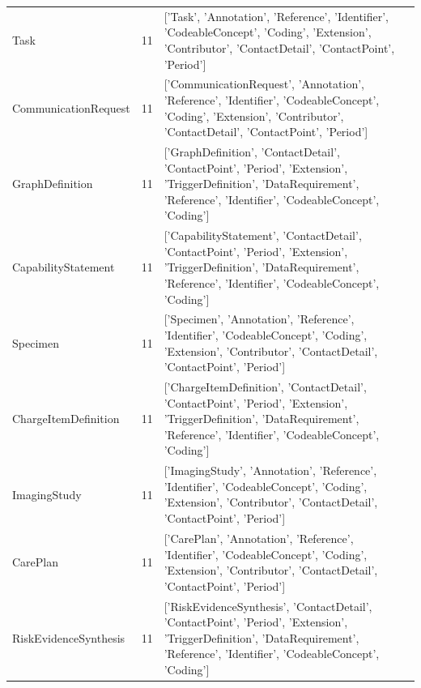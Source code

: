 \begin{tabular}{lrl}
Task & 11 & ['Task', 'Annotation', 'Reference', 'Identifier', 'CodeableConcept', 'Coding', 'Extension', 'Contributor', 'ContactDetail', 'ContactPoint', 'Period'] \\
CommunicationRequest & 11 & ['CommunicationRequest', 'Annotation', 'Reference', 'Identifier', 'CodeableConcept', 'Coding', 'Extension', 'Contributor', 'ContactDetail', 'ContactPoint', 'Period'] \\
GraphDefinition & 11 & ['GraphDefinition', 'ContactDetail', 'ContactPoint', 'Period', 'Extension', 'TriggerDefinition', 'DataRequirement', 'Reference', 'Identifier', 'CodeableConcept', 'Coding'] \\
CapabilityStatement & 11 & ['CapabilityStatement', 'ContactDetail', 'ContactPoint', 'Period', 'Extension', 'TriggerDefinition', 'DataRequirement', 'Reference', 'Identifier', 'CodeableConcept', 'Coding'] \\
Specimen & 11 & ['Specimen', 'Annotation', 'Reference', 'Identifier', 'CodeableConcept', 'Coding', 'Extension', 'Contributor', 'ContactDetail', 'ContactPoint', 'Period'] \\
ChargeItemDefinition & 11 & ['ChargeItemDefinition', 'ContactDetail', 'ContactPoint', 'Period', 'Extension', 'TriggerDefinition', 'DataRequirement', 'Reference', 'Identifier', 'CodeableConcept', 'Coding'] \\
ImagingStudy & 11 & ['ImagingStudy', 'Annotation', 'Reference', 'Identifier', 'CodeableConcept', 'Coding', 'Extension', 'Contributor', 'ContactDetail', 'ContactPoint', 'Period'] \\
CarePlan & 11 & ['CarePlan', 'Annotation', 'Reference', 'Identifier', 'CodeableConcept', 'Coding', 'Extension', 'Contributor', 'ContactDetail', 'ContactPoint', 'Period'] \\
RiskEvidenceSynthesis & 11 & ['RiskEvidenceSynthesis', 'ContactDetail', 'ContactPoint', 'Period', 'Extension', 'TriggerDefinition', 'DataRequirement', 'Reference', 'Identifier', 'CodeableConcept', 'Coding'] \\
\bottomrule
\end{tabular}
